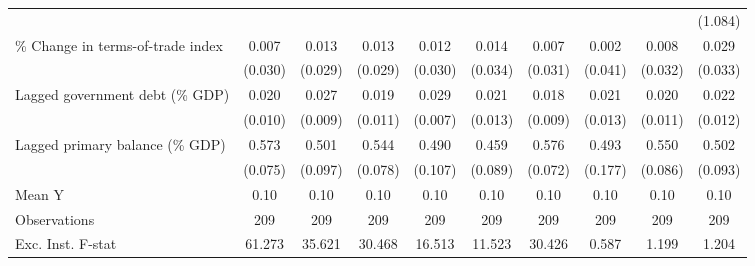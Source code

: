 {\begin{tabular}{l*{9}{c}}
                    &                     &                     &                     &                     &                     &                     &                     &                     &     (1.084)         \\
\addlinespace
\% Change in terms-of-trade index&       0.007         &       0.013         &       0.013         &       0.012         &       0.014         &       0.007         &       0.002         &       0.008         &       0.029         \\
                    &     (0.030)         &     (0.029)         &     (0.029)         &     (0.030)         &     (0.034)         &     (0.031)         &     (0.041)         &     (0.032)         &     (0.033)         \\
\addlinespace
Lagged government debt (\% GDP)&       0.020\sym{*}  &       0.027\sym{***}&       0.019\sym{*}  &       0.029\sym{***}&       0.021\sym{*}  &       0.018\sym{*}  &       0.021\sym{*}  &       0.020\sym{*}  &       0.022\sym{*}  \\
                    &     (0.010)         &     (0.009)         &     (0.011)         &     (0.007)         &     (0.013)         &     (0.009)         &     (0.013)         &     (0.011)         &     (0.012)         \\
\addlinespace
Lagged primary balance (\% GDP)&       0.573\sym{***}&       0.501\sym{***}&       0.544\sym{***}&       0.490\sym{***}&       0.459\sym{***}&       0.576\sym{***}&       0.493\sym{***}&       0.550\sym{***}&       0.502\sym{***}\\
                    &     (0.075)         &     (0.097)         &     (0.078)         &     (0.107)         &     (0.089)         &     (0.072)         &     (0.177)         &     (0.086)         &     (0.093)         \\
\midrule
Mean Y              &        0.10         &        0.10         &        0.10         &        0.10         &        0.10         &        0.10         &        0.10         &        0.10         &        0.10         \\
Observations        &         209         &         209         &         209         &         209         &         209         &         209         &         209         &         209         &         209         \\
Exc. Inst. F-stat   &      61.273         &      35.621         &      30.468         &      16.513         &      11.523         &      30.426         &       0.587         &       1.199         &       1.204         \\
\bottomrule
\end{tabular}
}
